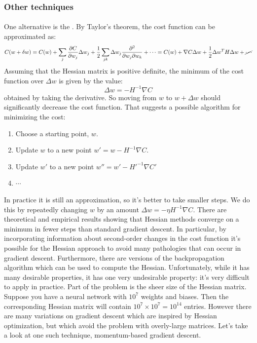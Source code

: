 \subsubsection{Other techniques}
\paragraph{} One alternative is the . By Taylor's theorem, the cost function can be approximated as:
\begin{equation}
C(w+\delta w) = C(w) +\sum_j \frac{\mathrm{\partial} C}{\mathrm{\partial} w_j}\Delta w_j +\frac{1}{2} \sum_{jk} \Delta w_j \frac{\mathrm{\partial}^ 2}{\mathrm{\partial} w_j \mathrm{\partial} w_k} + \cdots = C(w) + \nabla C \Delta w +\frac{1}{2} \Delta w^T H  \Delta w +\cancel{\cdots}
\end{equation} 
Assuming that the Hessian matrix is positive definite, the minimum of the cost function over $\Delta w$ is given by the value:
\begin{equation}
\Delta w = - H^{-1} \nabla C
\end{equation}
obtained by taking the derivative. So moving from $w$ to $w+\Delta w$ should significantly decrease the cost function. That suggests a possible algorithm for minimizing the cost:
\begin{enumerate}
\item Choose a starting point, $w$.
\item Update $w$ to a new point $w'=w-H^{-1}\nabla C$.
\item Update $w'$ to a new point $w''=w'-H'^{-1} \nabla C'$
\item $\cdots$
\end{enumerate}
In practice it is still an approximation, so it's better to take smaller steps. We do this by repeatedly changing $w$  by an amount $\Delta w = -\eta H^{-1} \nabla C$.
There are theoretical and empirical results showing that Hessian methods converge on a minimum in fewer steps than standard gradient descent. In particular, by incorporating information about second-order changes in the cost function it's possible for the Hessian approach to avoid many pathologies that can occur in gradient descent. Furthermore, there are versions of the backpropagation algorithm which can be used to compute the Hessian. 
Unfortunately, while it has many desirable properties, it has one very undesirable property: it's very difficult to apply in practice. Part of the problem is the sheer size of the Hessian matrix. Suppose you have a neural network with $10^7$ weights and biases. Then the corresponding Hessian matrix will contain $10^7\times 10^7=10^{14}$ entries. However there are many variations on gradient descent which are inspired by Hessian optimization, but which avoid the problem with overly-large matrices. Let's take a look at one such technique, momentum-based gradient descent.

